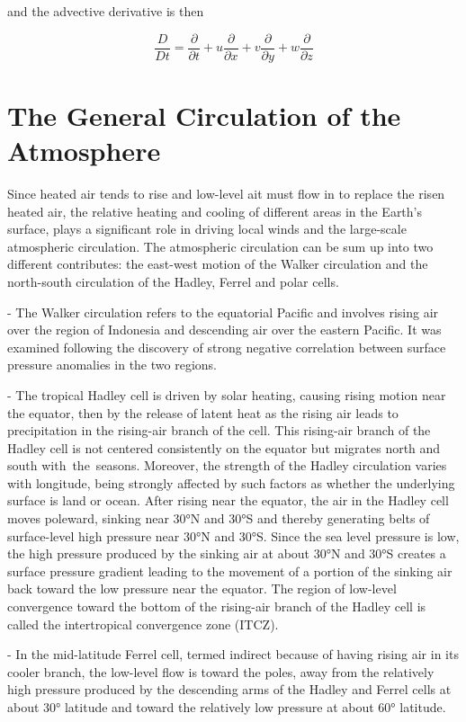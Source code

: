 and the advective derivative is then

\[\frac{D }{Dt} = \frac{\partial }{\partial t} + u\frac{\partial }{\partial x} + v\frac{\partial }{\partial y} + w\frac{\partial }{\partial z}\]


\section{The General Circulation of the
Atmosphere}\label{chp:GeneralCirculation}

Since heated air tends to rise and low-level ait must flow in to replace the risen heated air, the relative heating and cooling of different areas in the Earth’s surface, plays a significant role in driving local winds and the large-scale atmospheric circulation. The atmospheric circulation can be sum up into two different contributes: the east-west motion of the Walker circulation and the north-south circulation of the Hadley, Ferrel and polar cells. 

- The Walker circulation refers to the equatorial Pacific and involves rising air over the region of Indonesia and descending air over the eastern Pacific. It was examined following the discovery of strong negative correlation between surface pressure anomalies in the two regions. 

- The tropical Hadley cell is driven by solar heating, causing rising motion near the equator, then by the release of latent heat as the rising air leads to precipitation in the rising-air branch of the cell. This rising-air branch of the Hadley cell is not centered consistently on the equator but migrates north and south with the seasons. Moreover, the strength of the Hadley circulation varies with longitude, being strongly affected by such factors as whether the underlying surface is land or ocean. After rising near the equator, the air in the Hadley cell moves poleward, sinking near 30°N and 30°S and thereby generating belts of surface-level high pressure near 30°N and 30°S. Since the sea level pressure is low, the high pressure produced by the sinking air at about 30°N and 30°S creates a surface pressure gradient leading to the movement of a portion of the sinking air back toward the low pressure near the equator. The region of low-level convergence toward the bottom of the rising-air branch of the Hadley cell is called the intertropical convergence zone (ITCZ). 

- In the mid-latitude Ferrel cell, termed indirect because of having rising air in its cooler branch, the low-level flow is toward the poles, away from the relatively high pressure produced by the descending arms of the Hadley and Ferrel cells at about 30° latitude and toward the relatively low pressure at about 60° latitude. 

